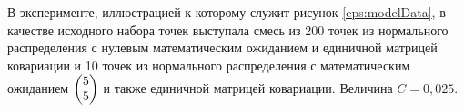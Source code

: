 В эксперименте, иллюстрацией к которому служит рисунок \ref{eps:modelData}, в качестве исходного набора точек выступала смесь из 200 точек из нормального распределения с нулевым математическим ожиданием и единичной матрицей ковариации и 10 точек из нормального распределения с математическим ожиданием $\begin{pmatrix} 5 \\ 5 \end{pmatrix}$ и также единичной матрицей ковариации. Величина $C = 0{,}025.$

